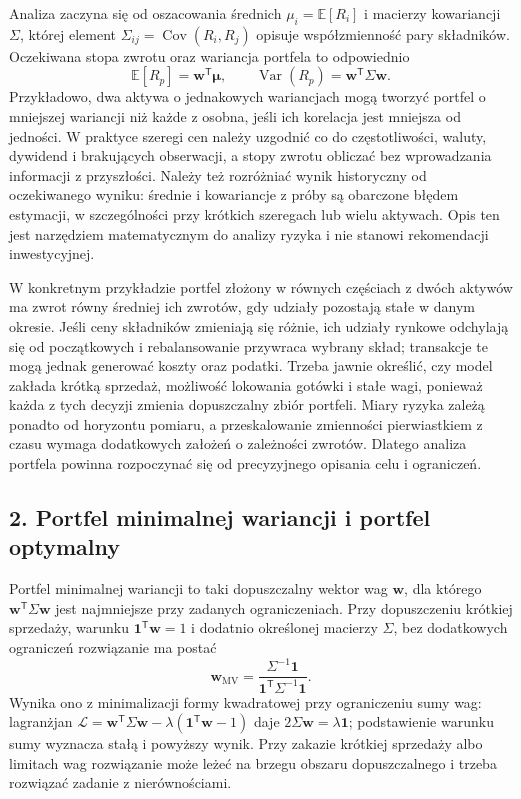 \documentclass[11pt,a4paper]{article}
\begin{document}
Analiza zaczyna się od oszacowania średnich \(\mu_i=\mathbb E[R_i]\) i macierzy kowariancji \(\Sigma\), której element \(\Sigma_{ij}=\operatorname{Cov}(R_i,R_j)\) opisuje współzmienność pary składników. Oczekiwana stopa zwrotu oraz wariancja portfela to odpowiednio
\[
\mathbb E[R_p]=\mathbf w^{\mathsf T}\boldsymbol\mu,\qquad
\operatorname{Var}(R_p)=\mathbf w^{\mathsf T}\Sigma\mathbf w.
\]
Przykładowo, dwa aktywa o jednakowych wariancjach mogą tworzyć portfel o mniejszej wariancji niż każde z osobna, jeśli ich korelacja jest mniejsza od jedności. W praktyce szeregi cen należy uzgodnić co do częstotliwości, waluty, dywidend i brakujących obserwacji, a stopy zwrotu obliczać bez wprowadzania informacji z przyszłości. Należy też rozróżniać wynik historyczny od oczekiwanego wyniku: średnie i kowariancje z próby są obarczone błędem estymacji, w szczególności przy krótkich szeregach lub wielu aktywach. Opis ten jest narzędziem matematycznym do analizy ryzyka i nie stanowi rekomendacji inwestycyjnej.

W konkretnym przykładzie portfel złożony w równych częściach z dwóch aktywów ma zwrot równy średniej ich zwrotów, gdy udziały pozostają stałe w danym okresie. Jeśli ceny składników zmieniają się różnie, ich udziały rynkowe odchylają się od początkowych i rebalansowanie przywraca wybrany skład; transakcje te mogą jednak generować koszty oraz podatki. Trzeba jawnie określić, czy model zakłada krótką sprzedaż, możliwość lokowania gotówki i stałe wagi, ponieważ każda z tych decyzji zmienia dopuszczalny zbiór portfeli. Miary ryzyka zależą ponadto od horyzontu pomiaru, a przeskalowanie zmienności pierwiastkiem z czasu wymaga dodatkowych założeń o zależności zwrotów. Dlatego analiza portfela powinna rozpoczynać się od precyzyjnego opisania celu i ograniczeń.

\subsection{2. Portfel minimalnej wariancji i portfel optymalny}

Portfel minimalnej wariancji to taki dopuszczalny wektor wag \(\mathbf w\), dla którego \(\mathbf w^{\mathsf T}\Sigma\mathbf w\) jest najmniejsze przy zadanych ograniczeniach. Przy dopuszczeniu krótkiej sprzedaży, warunku \(\mathbf 1^{\mathsf T}\mathbf w=1\) i dodatnio określonej macierzy \(\Sigma\), bez dodatkowych ograniczeń rozwiązanie ma postać
\[
\mathbf w_{\mathrm{MV}}=
\frac{\Sigma^{-1}\mathbf 1}{\mathbf 1^{\mathsf T}\Sigma^{-1}\mathbf 1}.
\]
Wynika ono z minimalizacji formy kwadratowej przy ograniczeniu sumy wag: lagranżjan \(\mathcal L=\mathbf w^{\mathsf T}\Sigma\mathbf w-\lambda(\mathbf 1^{\mathsf T}\mathbf w-1)\) daje \(2\Sigma\mathbf w=\lambda\mathbf 1\); podstawienie warunku sumy wyznacza stałą i powyższy wynik. Przy zakazie krótkiej sprzedaży albo limitach wag rozwiązanie może leżeć na brzegu obszaru dopuszczalnego i trzeba rozwiązać zadanie z nierównościami.
\end{document}
